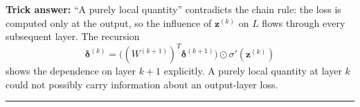\documentclass[12pt]{amsart}
\newcommand{\divider}{
  \vspace{-1em}
  \noindent
  \raisebox{-0.15ex}{\textbullet}%
  \hspace{0.5em}%
  \rule[0.5ex]{0.95\textwidth}{1.0pt}%
  \hspace{0.5em}%
  \raisebox{-0.15ex}{\textbullet}%
  \vspace{0em}
}
\begin{document}
\textbf{Trick answer:}
``A purely local quantity'' contradicts the chain rule: the loss is computed
only at the output, so the influence of $\mathbf{z}^{(k)}$ on $L$ flows
through every subsequent layer. The recursion
$$\boldsymbol{\delta}^{(k)} = \big((W^{(k+1)})^T \boldsymbol{\delta}^{(k+1)}\big)
\odot \sigma'(\mathbf{z}^{(k)})$$
shows the dependence on layer $k+1$ explicitly. A purely local quantity at
layer $k$ could not possibly carry information about an output-layer loss.

\divider
\end{document}
